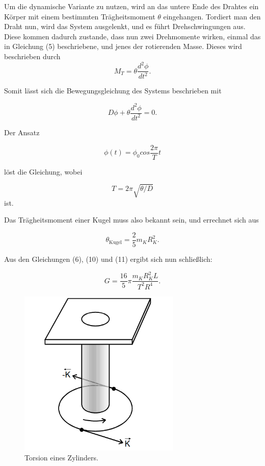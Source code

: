 Um die dynamische Variante zu nutzen, wird an das untere Ende des Drahtes ein Körper mit einem bestimmten Trägheitsmoment $\theta$
eingehangen. Tordiert man den Draht nun, wird das System ausgelenkt, und es führt Drehschwingungen aus.
Diese kommen dadurch zustande, dass nun zwei Drehmomente wirken, einmal das in Gleichung (5) beschriebene, und jenes der rotierenden Masse.
Dieses wird beschrieben durch
\begin{equation}
  M_T = \theta \frac{d^{2}\phi}{dt^{2}} .
\end{equation}

Somit lässt sich die Bewegungsgleichung des Systems beschrieben mit

\begin{equation}
  D\phi + \theta \frac{d^{2}\phi}{dt^{2}} = 0 .
\end{equation}

Der Ansatz

\begin{equation}
  \phi(t) = \phi_0 cos \frac{2\pi}{T}t 
\end{equation}

löst die Gleichung, wobei

\begin{equation}
  T = 2 \pi \sqrt{\theta/D}  
\end{equation}
ist.

Das Trägheitsmoment einer Kugel muss also bekannt sein, und errechnet sich aus

\begin{equation}
  \theta_\text{Kugel} = \frac{2}{5}m_K R_K^{2} .
\end{equation}

Aus den Gleichungen (6), (10) und (11) ergibt sich nun schließlich:

\begin{equation}
 G = \frac{16}{5}\pi \frac{m_K R_K^{2}L}{T^{2}R^{4}} .
\end{equation}

\begin{figure}[H]
 \centering
  \includegraphics[height=8cm]{Screenshot (9).png}
  \caption{Torsion eines Zylinders.\cite{kent}}
  \label{fig:drill}
\end{figure}


